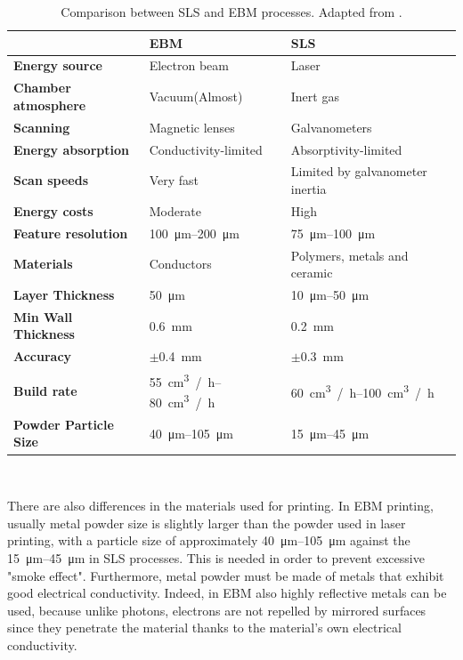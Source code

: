 \begin{table}
\small
    \centering 
    \begin{tabular}{|l l l|}
    \hline
    \rowcolor{bluepoli!40} %
     & \textbf{EBM} & \textbf{SLS} \T\B \\
    \hline \hline
    \textbf{Energy source} & Electron beam & Laser  \T\B \\ 
    \textbf{Chamber atmosphere} & Vacuum(Almost) & Inert gas  \T\B\\
    \textbf{Scanning} & Magnetic lenses & Galvanometers \T\B \\
    \textbf{Energy absorption} & Conductivity-limited & Absorptivity-limited \T\B\\
    \textbf{Scan speeds} & Very fast & Limited by galvanometer inertia \T\B\\
    \textbf{Energy costs} & Moderate & High \T\B\\
    \textbf{Feature resolution} & \SIrange{100}{200}{\micro\metre} & \SIrange{75}{100}{\micro\metre}  \T\B\\
    \textbf{Materials} & Conductors & Polymers, metals and ceramic \T\B\\
    \textbf{Layer Thickness} & \SI{50}{\micro\metre} & \SIrange{10}{50}{\micro\metre}  \T\B\\
    \textbf{Min Wall Thickness} & \SI{0.6}{\milli\metre} & \SI{0.2}{\milli\metre} \T\B\\
    \textbf{Accuracy} & $\pm$\SI{0.4}{\milli\metre} & $\pm$\SI{0.3}{\milli\metre} \T\B\\
    \textbf{Build rate} & \SIrange[range-phrase=--]{55}{80}{\centi\metre^3 / \hour} & \SIrange[range-phrase=--]{60}{100}{\centi\metre^3 / \hour} \T\B\\
    \textbf{Powder Particle Size} & \SIrange[range-phrase = --]{40}{105}{\micro\meter} & \SIrange[range-phrase = --]{15}{45}{\micro\meter} \T\B\\
    \hline
    \end{tabular}
    \\[10pt]
    \caption{Comparison between SLS and EBM processes. Adapted from \cite{gallina_electron_2017}.}
    \label{table:slsvsebm}
\end{table}
 There are also differences in the materials used for printing. In EBM printing, usually metal powder size is slightly larger than the powder used in laser printing, with a particle size of approximately \SIrange[range-phrase = --]{40}{105}{\micro\meter} against the \SIrange[range-phrase = --]{15}{45}{\micro\meter} in SLS processes. This is needed in order to prevent excessive "smoke effect". Furthermore, metal powder must be made of metals that exhibit good electrical conductivity. Indeed, in EBM also highly reflective metals can be used, because unlike photons, electrons are not repelled by mirrored surfaces since they penetrate the material thanks to the material's own electrical conductivity.


